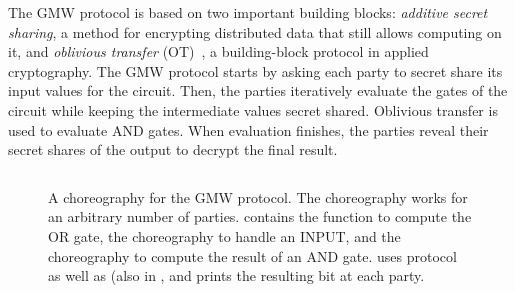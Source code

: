 The GMW protocol is based on two important building blocks: \emph{additive secret sharing}, a method for encrypting distributed data that still allows computing on it, and \emph{oblivious transfer} (OT)~\cite{naor2001efficient}, a building-block protocol in applied cryptography. The GMW protocol starts by asking each party to secret share its input values for the circuit. Then, the parties iteratively evaluate the gates of the circuit while keeping the intermediate values secret shared. Oblivious transfer is used to evaluate AND gates. When evaluation finishes, the parties reveal their secret shares of the output to decrypt the final result.

\begin{figure*}[tbhp]
  \begin{mdframed}
    \inputminted[xleftmargin=10pt,linenos,fontsize=\scriptsize]{Haskell}{figures/gmw.hs.txt}
    \caption{A choreography for the GMW protocol. The choreography works for an arbitrary number of parties.
       contains the  function to compute the OR gate,
      the  choreography to handle an INPUT,
      and the  choreography to compute the result of an AND gate.
	   uses  protocol as well as 
	  (also in , and prints the resulting bit at each party.}
    \label{fig:gmw-multichor-example}
  \end{mdframed}
\end{figure*}

